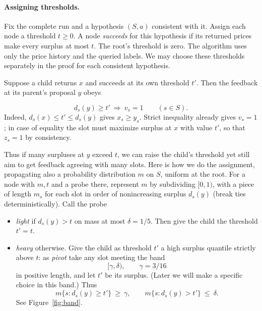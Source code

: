\paragraph{Assigning thresholds.}
Fix the complete run and a hypothesis \((S,a)\) consistent with it.
Assign each node a threshold \(t\ge0\). A node \emph{succeeds} for this
hypothesis if its returned prices make every surplus at most \(t\).
The root's threshold is zero. The algorithm uses only the price history
and the queried labels. We may choose these thresholds separately in
the proof for each consistent hypothesis.

Suppose a child returns \(x\) and succeeds at its own threshold \(t'\).
Then the feedback at its parent's proposal \(y\) obeys

\begin{equation}\label{eq:correct}
            d_s(y)\ge t' \ \Longrightarrow\ v_s=1
            \qquad(s\in S).
\end{equation}
Indeed, \(d_s(x)\le t'\le d_s(y)\) gives \(x_s\ge y_s\).
Strict inequality already gives \(v_s=1\);
in case of equality the slot must maximize surplus at \(x\)
with value \(t'\),
so that \(z_s=1\) by consistency.

Thus if many surpluses at \(y\) exceed \(t\), we can
raise the child's threshold yet still aim to get feedback
agreeing with many slots.
Here is how we do the assignment, propagating also a probability
distribution \(m\) on \(S\), uniform at the root.
For a node with \(m,t\) and a probe there, represent \(m\) by subdividing \([0,1)\),
with a piece of length \(m_s\) for each slot in order of
nonincreasing surplus \(d_s(y)\) (break ties deterministically).
Call the probe
\begin{itemize}
 \item \emph{light} if \(d_s(y)>t\)
 on mass at most \(\delta=1/5\). Then give the child the threshold \(t'=t\).
 \item \emph{heavy} otherwise. Give the child as threshold
 \(t'\) a high surplus quantile strictly above \(t\):
 as \emph{pivot} take any slot meeting the band
 \[
           [\gamma,\delta),\qquad \gamma=3/16
 \]
 in positive length, and let \(t'\) be its surplus.
 (Later we will make a specific choice in this band.)
 Thus
 \begin{equation}\label{eq:band}
 m\{s:d_s(y)\ge t'\}\ \ge\ \gamma,
 \qquad
 m\{s:d_s(y)> t'\}\ \le\ \delta .
 \end{equation}
 See Figure~\ref{fig:band}.
\end{itemize}

